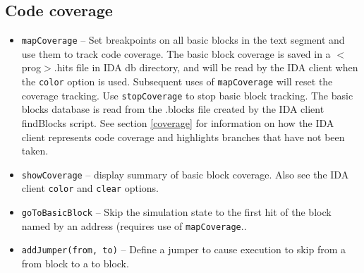 \documentclass[titlepage]{article}
\begin{document}
\subsection{Code coverage}
\begin{itemize}
\item {\tt mapCoverage} -- Set breakpoints on all basic blocks in the text segment and use them to track code coverage. The basic block coverage is
saved in a $<$prog$>$.hits file in IDA db directory, and will be read by the IDA client when the {\tt color} option is used. Subsequent uses of {\tt mapCoverage}
will reset the coverage tracking.  Use {\tt stopCoverage} to stop basic block tracking.  The basic blocks database is read from the .blocks file created
by the IDA client findBlocks script.  See section \ref{coverage} for information on how the IDA client represents code coverage and highlights
branches that have not been taken.

\item {\tt showCoverage} -- display summary of basic block coverage.  Also see the IDA client {\tt color} and {\tt clear} options.

\item{\tt goToBasicBlock} -- Skip the simulation state to the first hit of the block named by an address (requires use of {\tt mapCoverage}..

\item{\tt addJumper(from, to)} -- Define a jumper to cause execution to skip from a from block to a to block.
\end{itemize}
\end{document}
